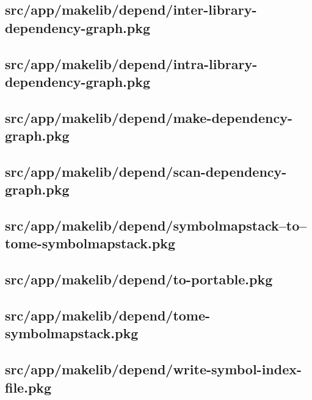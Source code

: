 \subsection{src/app/makelib/depend/inter-library-dependency-graph.pkg}


\subsection{src/app/makelib/depend/intra-library-dependency-graph.pkg}


\subsection{src/app/makelib/depend/make-dependency-graph.pkg}


\subsection{src/app/makelib/depend/scan-dependency-graph.pkg}


\subsection{src/app/makelib/depend/symbolmapstack--to--tome-symbolmapstack.pkg}


\subsection{src/app/makelib/depend/to-portable.pkg}


\subsection{src/app/makelib/depend/tome-symbolmapstack.pkg}


\subsection{src/app/makelib/depend/write-symbol-index-file.pkg}


